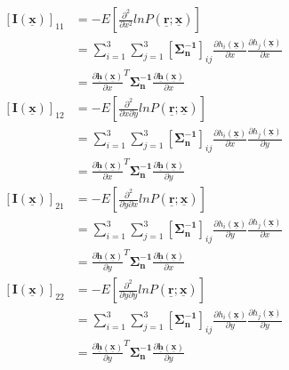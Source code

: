\documentclass[a4 paper]{article}
\begin{document}
\begin{align*}
\\ [\mathbf{I(\mathbf{\underline{x}})}]_{11} &= -E[\frac{\partial^{2}}{\partial x^{2}}ln P(\mathbf{\underline{r}}; \mathbf{\underline{x}})]
\\ &= \sum_{i =1}^{3}\sum_{j=1}^{3} [\mathbf{\Sigma_{n}^{-1}}]_{ij}\frac{\partial h_{i}(\mathbf{\underline{x}})}{\partial x}\frac{\partial h_{j}(\mathbf{\underline{x}})}{\partial x}
\\ &= \frac{\partial \mathbf{\underline{h}}(\mathbf{\underline{x}})}{\partial x}^{T} \mathbf{\Sigma_{n}^{-1}} \frac{\partial \mathbf{\underline{h}(\mathbf{\underline{x}})}}{\partial x}
\\ [\mathbf{I(\mathbf{\underline{x}})}]_{12} &= -E[\frac{\partial^{2}}{\partial x \partial y}ln P(\mathbf{\underline{r}}; \mathbf{\underline{x}})]
\\ &= \sum_{i =1}^{3}\sum_{j=1}^{3} [\mathbf{\Sigma_{n}^{-1}}]_{ij}\frac{\partial h_{i}(\mathbf{\underline{x}})}{\partial x}\frac{\partial h_{j}(\mathbf{\underline{x}})}{\partial y}
\\ &= \frac{\partial \mathbf{\underline{h}}(\mathbf{\underline{x}})}{\partial x}^{T} \mathbf{\Sigma_{n}^{-1}} \frac{\partial \mathbf{\underline{h}(\mathbf{\underline{x}})}}{\partial y}
\\ [\mathbf{I(\mathbf{\underline{x}})}]_{21} &= -E[\frac{\partial^{2}}{\partial y \partial x}ln P(\mathbf{\underline{r}}; \mathbf{\underline{x}})]
\\ &= \sum_{i =1}^{3}\sum_{j=1}^{3} [\mathbf{\Sigma_{n}^{-1}}]_{ij}\frac{\partial h_{i}(\mathbf{\underline{x}})}{\partial y}\frac{\partial h_{j}(\mathbf{\underline{x}})}{\partial x}
\\ &= \frac{\partial \mathbf{\underline{h}}(\mathbf{\underline{x}})}{\partial y}^{T} \mathbf{\Sigma_{n}^{-1}} \frac{\partial \mathbf{\underline{h}(\mathbf{\underline{x}})}}{\partial x}
\\ [\mathbf{I(\mathbf{\underline{x}})}]_{22} &= -E[\frac{\partial^{2}}{\partial y \partial y}ln P(\mathbf{\underline{r}}; \mathbf{\underline{x}})]
\\ &= \sum_{i =1}^{3}\sum_{j=1}^{3} [\mathbf{\Sigma_{n}^{-1}}]_{ij}\frac{\partial h_{i}(\mathbf{\underline{x}})}{\partial y}\frac{\partial h_{j}(\mathbf{\underline{x}})}{\partial y}
\\ &= \frac{\partial \mathbf{\underline{h}}(\mathbf{\underline{x}})}{\partial y}^{T} \mathbf{\Sigma_{n}^{-1}} \frac{\partial \mathbf{\underline{h}(\mathbf{\underline{x}})}}{\partial y}
\end{align*}
\end{document}
